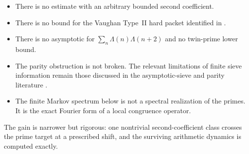 \begin{itemize}
 \item There is no estimate with an arbitrary bounded second coefficient.
 \item There is no bound for the Vaughan Type~II hard packet identified in
 \citet{WangTPCSix2026}.
 \item There is no asymptotic for
 $\sum_n\Lambda(n)\Lambda(n+2)$ and no twin-prime lower bound.
 \item The parity obstruction is not broken.  The relevant limitations of
 finite sieve information remain those discussed in the asymptotic-sieve
 and parity literature \citep{FriedlanderIwaniec1998,Polymath2014}.
 \item The finite Markov spectrum below is not a spectral realization of
 the primes.  It is the exact Fourier form of a local congruence operator.
\end{itemize}

The gain is narrower but rigorous: one nontrivial second-coefficient class
crosses the prime target at a prescribed shift, and the surviving arithmetic
dynamics is computed exactly.
